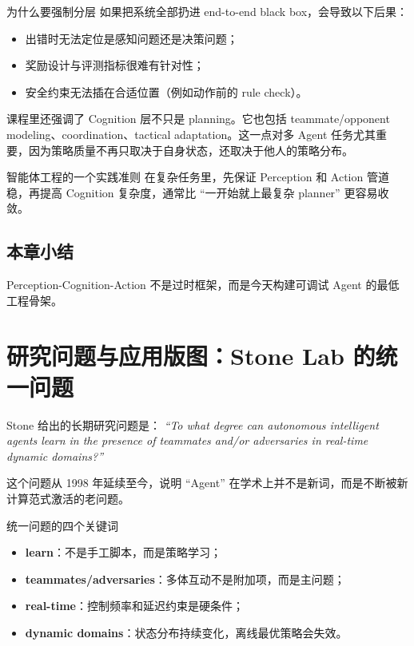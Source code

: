 \documentclass[a4paper]{article}
\begin{document}
\begin{knowledgebox}{为什么要强制分层}
如果把系统全部扔进 end-to-end black box，会导致以下后果：
\begin{itemize}
    \item 出错时无法定位是感知问题还是决策问题；
    \item 奖励设计与评测指标很难有针对性；
    \item 安全约束无法插在合适位置（例如动作前的 rule check）。
\end{itemize}
\end{knowledgebox}

课程里还强调了 Cognition 层不只是 planning。它也包括 teammate/opponent modeling、coordination、tactical adaptation。这一点对多 Agent 任务尤其重要，因为策略质量不再只取决于自身状态，还取决于他人的策略分布。

\begin{importantbox}{智能体工程的一个实践准则}
在复杂任务里，先保证 Perception 和 Action 管道稳，再提高 Cognition 复杂度，通常比 ``一开始就上最复杂 planner'' 更容易收敛。
\end{importantbox}

\subsection{本章小结}
Perception-Cognition-Action 不是过时框架，而是今天构建可调试 Agent 的最低工程骨架。

\section{研究问题与应用版图：Stone Lab 的统一问题}

Stone 给出的长期研究问题是：
\textit{``To what degree can autonomous intelligent agents learn in the presence of teammates and/or adversaries in real-time dynamic domains?''}

这个问题从 1998 年延续至今，说明 ``Agent'' 在学术上并不是新词，而是不断被新计算范式激活的老问题。

\begin{importantbox}{统一问题的四个关键词}
\begin{itemize}
    \item \textbf{learn}：不是手工脚本，而是策略学习；
    \item \textbf{teammates/adversaries}：多体互动不是附加项，而是主问题；
    \item \textbf{real-time}：控制频率和延迟约束是硬条件；
    \item \textbf{dynamic domains}：状态分布持续变化，离线最优策略会失效。
\end{itemize}
\end{importantbox}
\end{document}
